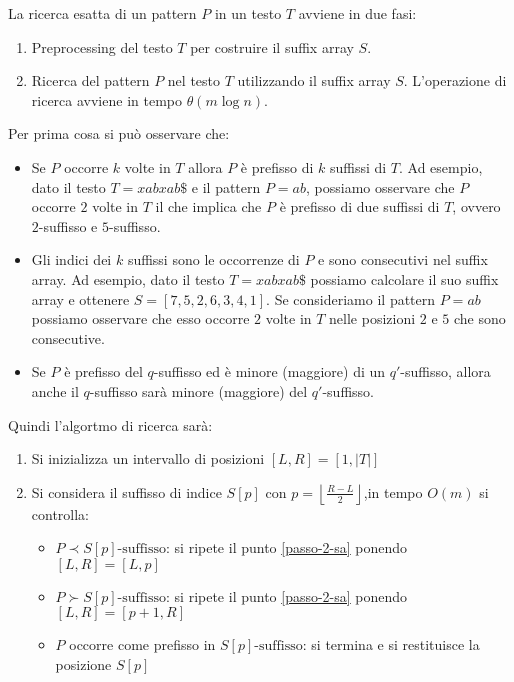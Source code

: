 La ricerca esatta di un pattern $P$ in un testo $T$ avviene in due fasi:
\begin{enumerate}
    \item Preprocessing del testo $T$ per costruire il suffix array $S$.
    \item Ricerca del pattern $P$ nel testo $T$ utilizzando il suffix array $S$.
          L'operazione di ricerca avviene in tempo $\theta(m \log n)$.
\end{enumerate}
Per prima cosa si può osservare che:
\begin{itemize}
    \item Se $P$ occorre $k$ volte in $T$ allora $P$ è prefisso di $k$ suffissi di $T$.
          Ad esempio, dato il testo $T = xabxab\$$ e il pattern $P = ab$, possiamo
          osservare che $P$ occorre $2$ volte in $T$ il che implica che $P$ è
          prefisso di due suffissi di $T$, ovvero $2$-suffisso e $5$-suffisso.
    \item Gli indici dei $k$ suffissi sono le occorrenze di $P$ e sono consecutivi
          nel suffix array. Ad esempio, dato il testo $T = xabxab\$$ possiamo
          calcolare il suo suffix array e ottenere $S=[7, 5, 2, 6, 3, 4, 1]$. Se
          consideriamo il pattern $P = ab$ possiamo osservare che  esso occorre
          $2$ volte in $T$ nelle posizioni $2$ e $5$ che sono consecutive.
    \item Se $P$ è prefisso del $q$-suffisso ed è minore (maggiore) di un $q'$-suffisso,
          allora anche il $q$-suffisso sarà minore (maggiore) del $q'$-suffisso.
\end{itemize}
Quindi l'algortmo di ricerca sarà:
\begin{enumerate}
    \item Si inizializza un intervallo di posizioni $[L,R]=[1,|T|]$
    \item \label{passo-2-sa} Si considera il suffisso di indice $S[p]$ con
          $p=\left\lfloor\frac{R-L}{2}\right\rfloor$,in tempo $O(m)$ si controlla:
          \begin{itemize}
              \item $P\prec S[p]\text{-suffisso}$: si ripete il punto \ref{passo-2-sa}
                    ponendo $[L,R]=[L,p]$
              \item $P\succ S[p]\text{-suffisso}$: si ripete il punto \ref{passo-2-sa}
                    ponendo $[L,R]=[p+1,R]$
              \item $P$ occorre come prefisso in $S[p]\text{-suffisso}$: si termina e
                    si restituisce la posizione $S[p]$
          \end{itemize}
\end{enumerate}
